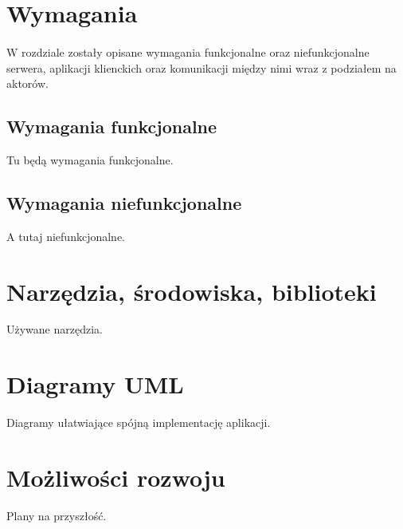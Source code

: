 \documentclass{article}
\begin{document}
    \section{Wymagania}
    \paragraph{}W rozdziale zostały opisane wymagania funkcjonalne oraz niefunkcjonalne serwera, aplikacji klienckich oraz komunikacji między nimi wraz z podziałem na aktorów.

    \subsection{Wymagania funkcjonalne}
    Tu będą wymagania funkcjonalne.

    \subsection{Wymagania niefunkcjonalne}
    A tutaj niefunkcjonalne.

    \section{Narzędzia, środowiska, biblioteki}
    Używane narzędzia.

    \section{Diagramy UML}
    Diagramy ułatwiające spójną implementację aplikacji.

    \section{Możliwości rozwoju}
    Plany na przyszłość.
\end{document}
